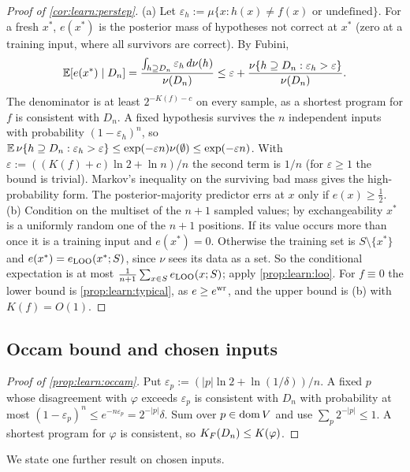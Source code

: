\begin{proof}[Proof of \cref{cor:learn:perstep}]
(a) Let $\varepsilon_h:=\mu\{x:h(x)\ne f(x)\text{ or undefined}\}$. For a fresh $x^*$, $e(x^*)$ is the posterior mass of hypotheses not correct at $x^*$ (zero at a training input, where all survivors are correct). By Fubini,
\[ \mathbb{E}[e(x^*)\mid D_n]=\frac{\int_{h\supseteq D_n}\varepsilon_h\,d\nu(h)}{\nu(D_n)}\le\varepsilon+\frac{\nu\{h\supseteq D_n:\varepsilon_h>\varepsilon\}}{\nu(D_n)}. \]
The denominator is at least $2^{-K(f)-c}$ on every sample, as a shortest program for $f$ is consistent with $D_n$. A fixed hypothesis survives the $n$ independent inputs with probability $(1-\varepsilon_h)^n$, so $\mathbb{E}\,\nu\{h\supseteq D_n:\varepsilon_h>\varepsilon\}\le\exp(-\varepsilon n)\nu(\emptyset)\le\exp(-\varepsilon n)$. With $\varepsilon:=((K(f)+c)\ln2+\ln n)/n$ the second term is $1/n$ (for $\varepsilon\ge1$ the bound is trivial). Markov's inequality on the surviving bad mass gives the high-probability form. The posterior-majority predictor errs at $x$ only if $e(x)\ge\frac12$.
(b) Condition on the multiset of the $n+1$ sampled values; by exchangeability $x^*$ is a uniformly random one of the $n+1$ positions. If its value occurs more than once it is a training input and $e(x^*)=0$. Otherwise the training set is $S\setminus\{x^*\}$ and $e(x^*)=e_{\rm LOO}(x^*;S)$, since $\nu$ sees its data as a set. So the conditional expectation is at most $\frac1{n+1}\sum_{x\in S}e_{\rm LOO}(x;S)$; apply \cref{prop:learn:loo}.
For $f\equiv0$ the lower bound is \cref{prop:learn:typical}, as $e\ge e^{\rm wr}$, and the upper bound is (b) with $K(f)=O(1)$.
\end{proof}

\subsection{Occam bound and chosen inputs}\label{app:learn:active}

\begin{proof}[Proof of \cref{prop:learn:occam}]
Put $\varepsilon_p:=(|p|\ln2+\ln(1/\delta))/n$. A fixed $p$ whose disagreement with $\varphi$ exceeds $\varepsilon_p$ is consistent with $D_n$ with probability at most $(1-\varepsilon_p)^n\le e^{-n\varepsilon_p}=2^{-|p|}\delta$. Sum over $p\in\operatorname{dom} V$ and use $\sum_p2^{-|p|}\le1$. A shortest program for $\varphi$ is consistent, so $K_{F}(D_n)\le K(\varphi)$.
\end{proof}

We state one further result on chosen inputs.

